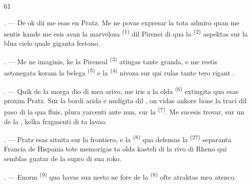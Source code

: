 %

\begin{VUpage}[63]{61}
\VUsaut{4.0mm}
\VUsaut{3.0mm}

\VUsaut{3.0mm}

\VUsaut{3.0mm}

. --- De ok dii me esas en Pratz. Me ne\nl
povas expresar la tota admiro quan me sentis\nl
kande me esis avan la marveloza  \textsuperscript{(1)}\nl
dil Pirenei di qua la  \textsuperscript{(2)} aspektas sur la\nl
blua cielo quale giganta festono.

. --- Me ne imaginis, ke la Pireneal \cc
{} \textsuperscript{(3)} atingas  tante granda, e me restis\nl
astonegata koram la belega  \textsuperscript{(5)} e la\nl
{} \textsuperscript{(4)} nivoza sur qui rulas tante tero\cc
rigant .

\VUsaut{3.0mm}
\VUsaut{3.0mm}

. --- Quik de la morga dio di mea arivo, me\nl
iris a la olda  \textsuperscript{(6)} extingita qua esas\nl
proxim Pratz. Sur la bordi arida e nudigita dil\nl
{}, on vidas ankore bone la traci dil paso\nl
di la  qua fluis, plura yarcenti ante nun,\nl
sur la  \textsuperscript{(7)}. Me sucesis trovar,\nl
sur un de la , kelka fragmenti di ta lavao.

. --- Pratz esas situita sur la frontiero, e la\nl
{} \textsuperscript{(8)} qua defensas la  \textsuperscript{(27)} separanta\nl
Francia de Hispania tote memorigas ta olda\nl
kasteli di la rivo di Rheno qui semblas guatar\nl
{} de la supro di sua roko.

. --- Enorm  \textsuperscript{(9)} qua havas sua nesto ne\nl
fore de la  \textsuperscript{(8)} ofte atraktas mea atenco.
\end{VUpage}

